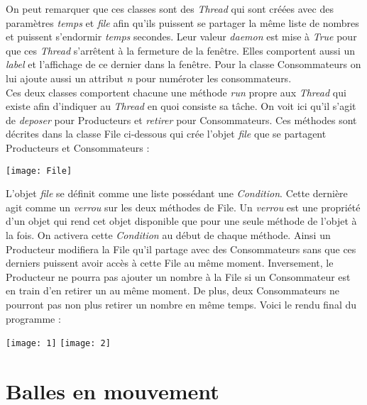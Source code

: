 \documentclass{article}
\begin{document}
On peut remarquer que ces classes sont des \textit{Thread} qui sont cr\'{e}\'{e}es avec des param\`{e}tres \textit{temps} et \textit{file} afin qu'ils puissent se partager la m\^{e}me liste de nombres et puissent s'endormir \textit{temps} secondes. Leur valeur \textit{daemon} est mise \`{a} \textit{True} pour que ces \textit{Thread} s'arr\^{e}tent \`{a} la fermeture de la fen\^{e}tre. Elles comportent aussi un \textit{label} et l'affichage de ce dernier dans la fen\^{e}tre. Pour la classe Consommateurs on lui ajoute aussi un attribut \textit{n} pour num\'{e}roter les consommateurs. 
\\ \indent Ces deux classes comportent chacune une m\'{e}thode \textit{run} propre aux \textit{Thread} qui existe afin d'indiquer au \textit{Thread} en quoi consiste sa t\^{a}che. On voit ici qu'il s'agit de \textit{deposer} pour Producteurs et \textit{retirer} pour Consommateurs. Ces m\'{e}thodes sont d\'{e}crites dans la classe File ci-dessous qui cr\'{e}e l'objet \textit{file} que se partagent Producteurs et Consommateurs : \\
\begin{center}
\texttt{[image: File]}
\end{center}

L'objet \textit{file} se d\'{e}finit comme une liste poss\'{e}dant une \textit{Condition}. Cette derni\`{e}re agit comme un \textit{verrou} sur les deux m\'{e}thodes de File. Un \textit{verrou} est une propri\'{e}t\'{e} d'un objet qui rend cet objet disponible que pour une seule m\'{e}thode de l'objet \`{a} la fois. On activera cette \textit{Condition} au d\'{e}but de chaque m\'{e}thode. Ainsi un Producteur modifiera la File qu'il partage avec des Consommateurs sans que ces derniers puissent avoir acc\`{e}s \`{a} cette File au m\^{e}me moment. Inversement, le Producteur ne pourra pas ajouter un nombre \`{a} la File si un Consommateur est en train d'en retirer un au m\^{e}me moment. De plus, deux Consommateurs ne pourront pas non plus retirer un nombre en m\^{e}me temps. Voici le rendu final du programme : \\

\begin{center}
\texttt{[image: 1]} {} {} {} {} {} {} \texttt{[image: 2]}
\end{center}

\section{Balles en mouvement}
\label{section:balles}
\end{document}
